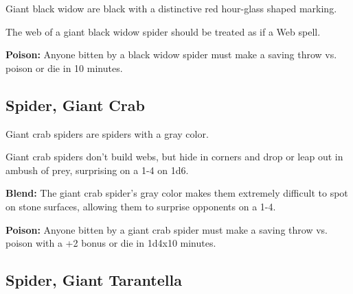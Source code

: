 \begin{multicols*}{2}
Giant black widow are black with a distinctive red hour-glass shaped marking.

The web of a giant black widow spider should be treated as if a Web spell.

\textbf{Poison:} Anyone bitten by a black widow spider must make a saving throw vs. poison or die in 10 minutes.

\subsection{Spider, Giant Crab}

Giant crab spiders are spiders with a gray color.

Giant crab spiders don’t build webs, but hide in corners and drop or leap out in ambush of prey, surprising on a 1-4 on 1d6.

\textbf{Blend:} The giant crab spider's gray color makes them extremely difficult to spot on stone surfaces, allowing them to surprise opponents on a 1-4.

\textbf{Poison:} Anyone bitten by a giant crab spider must make a saving throw vs. poison with a +2 bonus or die in 1d4x10 minutes.

\subsection{Spider, Giant Tarantella}
\end{multicols*}

